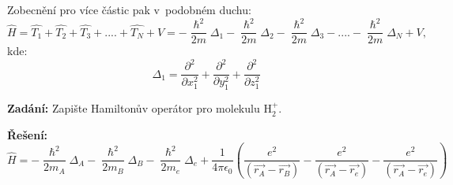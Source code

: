 \noindent Zobecnění pro více částic pak v~podobném duchu:
\begin{equation}
\hat{H} = \hat{T_1} + \hat{T_2} + \hat{T_3} + .... + \hat{T_N} + V = -\frac{\hslash^2}{2m}\Delta_1 - \frac{\hslash^2}{2m}\Delta_2 - \frac{\hslash^2}{2m}\Delta_3 - .... - \frac{\hslash^2}{2m}\Delta_N + V \mbox{,}
\label{rov:Vicecastic3}
\end{equation}
kde:
\begin{equation}
\Delta_1 = \frac{\partial^2}{\partial x_1^2} + \frac{\partial^2}{\partial y_1^2} + \frac{\partial^2}{\partial z_1^2}
\label{rov:Vicecastic4}
\end{equation}

\begin{priklad}
\textbf{Zadání:}  Zapište Hamiltonův operátor pro molekulu H$_2^{+}$.

\begin{center}

\end{center}

\textbf{Řešení:}
\begin{equation}
\hat{H} = -\frac{\hslash ^2}{2m_A} \Delta _A - \frac{\hslash^2}{2m_B}\Delta _B -\frac{\hslash^2}{2m_e}\Delta _e + \frac{1}{4\pi \epsilon _0} \left( \frac{e^2}{(\vec{r_A} - \vec{r_B})} - \frac{e^2}{(\vec{r_A} - \vec{r_e})}  - \frac{e^2}{(\vec{r_A} - \vec{r_e})} \right)
\nonumber
\label{rov:Vicecastic5}
\end{equation}

\end{priklad}





